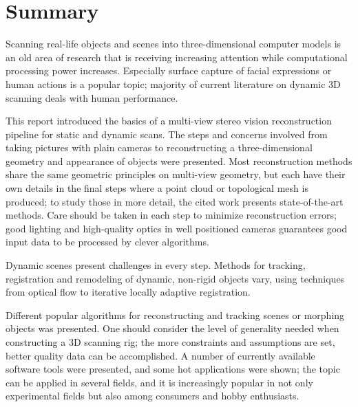 \section{Summary}


Scanning real-life objects and scenes into three-dimensional computer models is an old area of research that is receiving increasing attention while computational processing power increases.
Especially surface capture of facial expressions or human actions is a popular topic; majority of current literature on dynamic 3D scanning deals with human performance.

This report introduced the basics of a multi-view stereo vision reconstruction pipeline for static and dynamic scans.
The steps and concerns involved from taking pictures with plain cameras to reconstructing a three-dimensional geometry and appearance of objects were presented.
Most reconstruction methods share the same geometric principles on multi-view geometry, but each have their own details in the final steps where a point cloud or topological mesh is produced; to study those in more detail, the cited work presents state-of-the-art methods.
Care should be taken in each step to minimize reconstruction errors; good lighting and high-quality optics in well positioned cameras guarantees good input data to be processed by clever algorithms.

Dynamic scenes present challenges in every step. Methods for tracking, registration and remodeling of dynamic, non-rigid objects vary, using techniques from optical flow to iterative locally adaptive registration.

Different popular algorithms for reconstructing and tracking scenes or morphing objects was presented.
One should consider the level of generality needed when constructing a 3D scanning rig; the more constraints and assumptions are set, better quality data can be accomplished.
A number of currently available software tools were presented, and some hot applications were shown; the topic can be applied in several fields, and it is increasingly popular in not only experimental fields but also among consumers and hobby enthusiasts.
